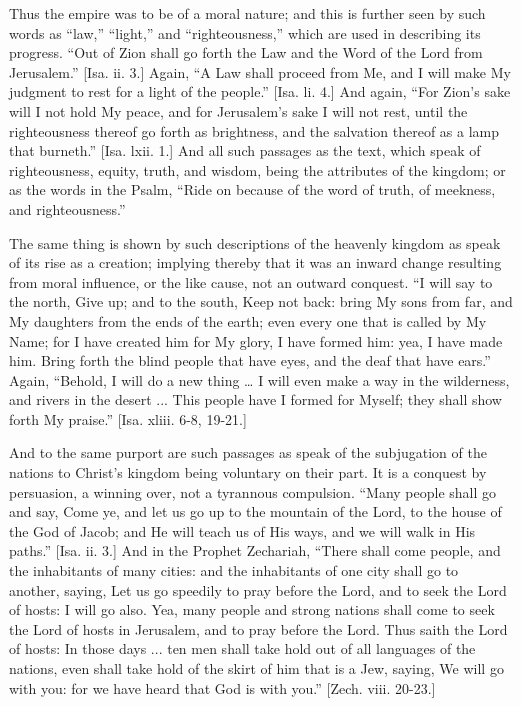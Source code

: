 Thus the empire was to be of a moral nature; and this is further
seen by such words as ``law,'' ``light,'' and
``righteousness,'' which are used in describing its progress.
``Out of Zion shall go forth the Law and the Word of the Lord from
Jerusalem.'' [Isa. ii. 3.] Again, ``A Law shall proceed from
Me, and I will make My judgment to rest for a light of the
people.'' [Isa. li. 4.] And again, ``For Zion's sake will I
not hold My peace, and for Jerusalem's sake I will not rest, until the
righteousness thereof go forth as brightness, and the salvation
thereof as a lamp that burneth.'' [Isa. lxii. 1.] And all such
passages as the text, which speak of righteousness, equity, truth, and
wisdom, being the attributes of the kingdom; or as the words in the
Psalm, ``Ride on because of the word of truth, of meekness, and
righteousness.''

The same thing is shown by such descriptions of the heavenly
kingdom as speak of its rise as a creation; implying thereby that it
was an inward change resulting from moral influence, or the like
cause, not an outward conquest. ``I will say to the north, Give
up; and to the south, Keep not back: bring My sons from far, and My
daughters from the ends of the earth; even every one that is called by
My Name; for I have created him for My glory, I have formed him: yea,
I have made him. Bring forth the blind people that have eyes, and the
deaf that have ears.'' Again, ``Behold, I will do a new thing
… I will even make a way in the wilderness, and rivers in the desert
... This people have I formed for Myself; they shall show forth My
praise.'' [Isa. xliii. 6-8, 19-21.]

And to the same purport are such passages as speak of the
subjugation of the nations to Christ's kingdom being voluntary on
their part. It is a conquest by persuasion, a winning over, not a
tyrannous compulsion. ``Many people shall go and say, Come ye, and
let us go up to the mountain of the Lord, to the house of the God of
Jacob; and He will teach us of His ways, and we will walk in His
paths.'' [Isa. ii. 3.] And in the Prophet Zechariah, ``There
shall come people, and the inhabitants of many cities: and the
inhabitants of one city shall go to another, saying, Let us go
speedily to pray before the Lord, and to seek the Lord of hosts: I
will go also. Yea, many people and strong nations shall come to seek
the Lord of hosts in Jerusalem, and to pray before the Lord. Thus
saith the Lord of hosts: In those days ... ten men shall take hold out
of all languages of the nations, even shall take hold of the skirt of
him that is a Jew, saying, We will go with you: for we have heard that
God is with you.'' [Zech. viii. 20-23.]

